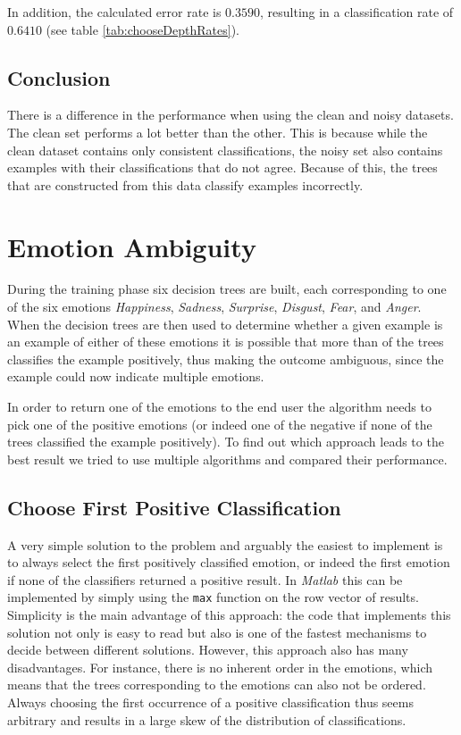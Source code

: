 \documentclass[11pt,a4paper]{article}
\begin{document}
In addition, the calculated error rate is $0.3590$, resulting in a classification rate of $0.6410$ (see table \ref{tab:chooseDepthRates}).

\subsection{Conclusion}

There is a difference in the performance when using the clean and noisy datasets. The clean set performs a lot better than the other. This is because while the clean dataset contains only consistent classifications, the noisy set also contains examples with their classifications that do not agree. Because of this, the trees that are constructed from this data classify examples incorrectly.


\section{Emotion Ambiguity}

During the training phase six decision trees are built, each corresponding to one of the six emotions \emph{Happiness}, \emph{Sadness}, \emph{Surprise}, \emph{Disgust}, \emph{Fear}, and \emph{Anger}. When the decision trees are then used to determine whether a given example is an example of either of these emotions it is possible that more than of the trees classifies the example positively, thus making the outcome ambiguous, since the example could now indicate multiple emotions. 

In order to return one of the emotions to the end user the algorithm needs to pick one of the positive emotions (or indeed one of the negative if none of the trees classified the example positively). To find out which approach leads to the best result we tried to use multiple algorithms and compared their performance.

\subsection{Choose First Positive Classification}

A very simple solution to the problem and arguably the easiest to implement is to always select the first positively classified emotion, or indeed the first emotion if none of the classifiers returned a positive result. In \emph{Matlab} this can be implemented by simply using the \texttt{max} function on the row vector of results. Simplicity is the main advantage of this approach: the code that implements this solution not only is easy to read but also is one of the fastest mechanisms to decide between different solutions. However, this approach also has many disadvantages. For instance, there is no inherent order in the emotions, which means that the trees corresponding to the emotions can also not be ordered. Always choosing the first occurrence of a positive classification thus seems arbitrary and results in a large skew of the distribution of classifications.
\end{document}

